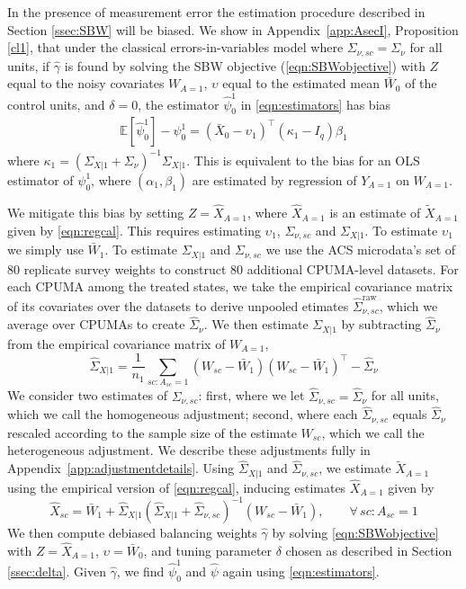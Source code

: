 \documentclass[aoas]{imsart}
\theoremstyle{plain}
\theoremstyle{remark}
\begin{document}
In the presence of measurement error the estimation procedure described in Section \ref{ssec:SBW} will be biased. We show in Appendix~\ref{app:AsecI}, Proposition \ref{cl1}, that under the classical errors-in-variables model where $\Sigma_{\nu,sc} = \Sigma_{\nu}$ for all units, if $\hat{\gamma}$ is found by solving the SBW objective (\ref{eqn:SBWobjective}) with $Z$ equal to the noisy covariates $W_{A=1}$, $\upsilon$ equal to the estimated mean $\bar{W}_0$ of the control units, and $\delta=0$, the estimator $\hat{\psi}_0^1$ in \eqref{eqn:estimators} has bias
\begin{align*}
\mathbb{E}[\hat{\psi}_0^1] - \psi_0^1 = (\bar{X}_0 - \upsilon_1)^\top(\kappa_1 - I_q)\beta_1 
\end{align*}
where $\kappa_1 = (\Sigma_{X|1} + \Sigma_{\nu})^{-1}\Sigma_{X|1}$. This is equivalent to the bias for an OLS estimator of $\psi_0^1$, where $(\alpha_1, \beta_1)$ are estimated by regression of $Y_{A=1}$ on $W_{A=1}$.

We mitigate this bias by setting $Z = \hat{X}_{A=1}$, where $\hat{X}_{A=1}$ is an estimate of $\tilde{X}_{A=1}$ given by \eqref{eqn:regcal}. This requires estimating $\upsilon_1$, $\Sigma_{\nu, sc}$ and $\Sigma_{X|1}$. To estimate $\upsilon_1$ we simply use $\bar{W}_1$. To estimate $\Sigma_{X|1}$ and $\Sigma_{\nu,sc}$ we use the ACS microdata's set of 80 replicate survey weights to construct 80 additional CPUMA-level datasets. For each CPUMA among the treated states, we take the empirical covariance matrix of its covariates over the datasets to derive unpooled etimates $\hat{\Sigma}_{\nu,sc}^{\text{raw}}$, which we average over CPUMAs to create $\hat{\Sigma}_{\nu}$. We then estimate $\Sigma_{X|1}$ by subtracting $\hat{\Sigma}_{\nu}$ from the empirical covariance matrix of $W_{A=1}$,
\[ \hat{\Sigma}_{X|1} = \frac{1}{n_1} \sum_{sc:A_{sc}=1} (W_{sc} - \bar{W}_1)(W_{sc} - \bar{W}_1)^\top - \hat{\Sigma}_{\nu}\]
We consider two estimates of $\Sigma_{\nu, sc}$: first, where we let $\hat{\Sigma}_{\nu,sc} = \hat{\Sigma}_{\nu}$ for all units, which we call the homogeneous adjustment; second, where each $\hat{\Sigma}_{\nu, sc}$ equals $\hat{\Sigma}_{\nu}$ rescaled according to the sample size of the estimate $W_{sc}$, which we call the heterogeneous adjustment. We describe these adjustments fully in Appendix~\ref{app:adjustmentdetails}. Using $\hat{\Sigma}_{X|1}$ and $\hat{\Sigma}_{\nu, sc}$, we estimate $\tilde{X}_{A=1}$ using the empirical version of \eqref{eqn:regcal}, inducing estimates $\hat{X}_{A=1}$ given by
\begin{equation}\label{eqn:hatX}
\hat{X}_{sc} = \bar{W}_1 + \hat{\Sigma}_{X|1} (\hat{\Sigma}_{X|1} + \hat{\Sigma}_{\nu,sc})^{-1}  (W_{sc} - \bar{W}_1), \qquad \forall\, sc: A_{sc}=1
\end{equation}
We then compute debiased balancing weights $\hat{\gamma}$ by solving \eqref{eqn:SBWobjective} with $Z = \hat{X}_{A=1}$, $\upsilon = \bar{W}_0$, and tuning parameter $\delta$ chosen as described in Section \ref{ssec:delta}. Given $\hat{\gamma}$, we find $\hat{\psi}_0^1$ and $\hat{\psi}$ again using \eqref{eqn:estimators}.
\end{document}

